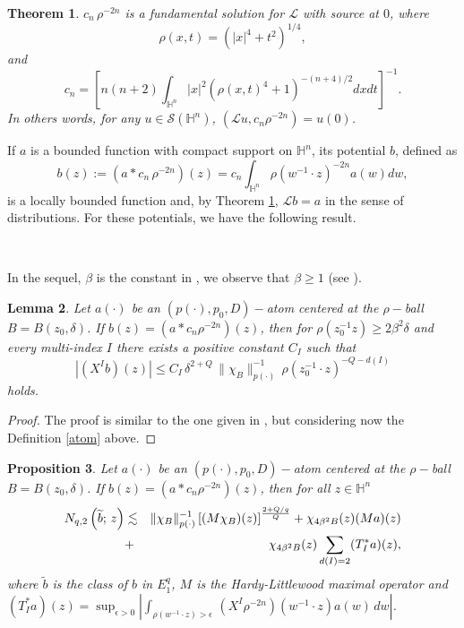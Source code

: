 \documentclass[oneside,10pt]{article}
\newtheorem{theorem}{Theorem}
\newtheorem{lemma}[theorem]{Lemma}
\newtheorem{proposition}[theorem]{Proposition}
\begin{document}
\begin{theorem} \label{fund solution}
$c_n \, \rho^{-2n}$ is a fundamental solution for $\mathcal{L}$ with source at $0$, where
\[
\rho(x,t) = (|x|^4 + t^2)^{1/4},
\]
and
\[
c_n = \left[ n(n+2) \int_{\mathbb{H}^n} |x|^2 (\rho(x,t)^4 + 1)^{-(n+4)/2} dxdt \right]^{-1}.
\]
In others words, for any $u \in \mathcal{S}(\mathbb{H}^{n})$, $\left( \mathcal{L}u,  c_n \rho^{-2n} \right) = u(0)$.
\end{theorem}

If $a$ is a bounded function with compact support on $\mathbb{H}^n$, its potential $b$, defined as 
\[
b(z) := \left( a \ast c_n \, \rho^{-2n} \right)(z) = c_n \int_{\mathbb{H}^{n}} \rho(w^{-1} \cdot z)^{-2n} a(w) dw,
\]
is a locally bounded function and, by Theorem \ref{fund solution}, $\mathcal{L} b = a$ in the sense of distributions. For these potentials, we have the following result.

\

In the sequel, $\beta$ is the constant in \cite[Corollary 1.44]{Foll-St}, we observe that $\beta \geq 1$ (see \cite[p. 29]{Foll-St}).

\begin{lemma} \label{b function} Let $a(\cdot)$ be an $(p(\cdot), p_{0}, D)-$atom centered at the $\rho-$ball $B=B(z_0, \delta)$. If $b(z) = (a \ast c_n \rho^{-2n})(z)$, then for $\rho(z_0^{-1} z) \geq 2 \beta^{2}\delta$ and every multi-index $I$ there exists a positive constant $C_{I}$ such that 
\[
\left| (X^{I}b)(z) \right| \leq C_{I} \, \delta^{2+Q} \, \|\chi_B \|^{-1}_{p(\cdot)} \, \rho(z_{0}^{-1} \cdot z)^{-Q-d(I)}
\]
holds.
\end{lemma}

\begin{proof} 
The proof is similar to the one given in \cite[Lemma 19]{rocha5}, but considering now the Definition \ref{atom} above.
\end{proof}

\begin{proposition} \label{main estimate}
Let $a(\cdot)$ be an $(p(\cdot), p_{0}, D)-$atom centered at the $\rho-$ball 
$B=B(z_0, \delta)$. If $b(z) = (a \ast c_n \rho^{-2n})(z)$, then for all $z \in \mathbb{H}^{n}$
\begin{eqnarray} 
\label{Nq2b}
N_{q, 2} \left(\widetilde{b}; \, z \right) &\lesssim& \| \chi_{B} \|_{p(\cdot)}^{-1} \left[(M \chi_{B})(z) \right]^{\frac{2 + Q/q}{Q}} + 
\chi_{4 \beta^2 B}(z) (M a)(z)  \\
\notag
&+& \chi_{4 \beta^2 B}(z) \sum_{d(I)=2} (T^{*}_{I} a)(z),
\end{eqnarray}
where $\widetilde{b}$ is the class of $b$ in $E^{q}_{1}$, $M$ is the Hardy-Littlewood maximal operator and $(T^{*}_{I} a) (z) = \sup_{\epsilon >0} \left|\int_{\rho(w^{-1} \cdot z) > \epsilon} \, (X^{I} \rho^{-2n})(w^{-1} \cdot z) a(w) \, dw \right|$.
\end{proposition}
\end{document}
